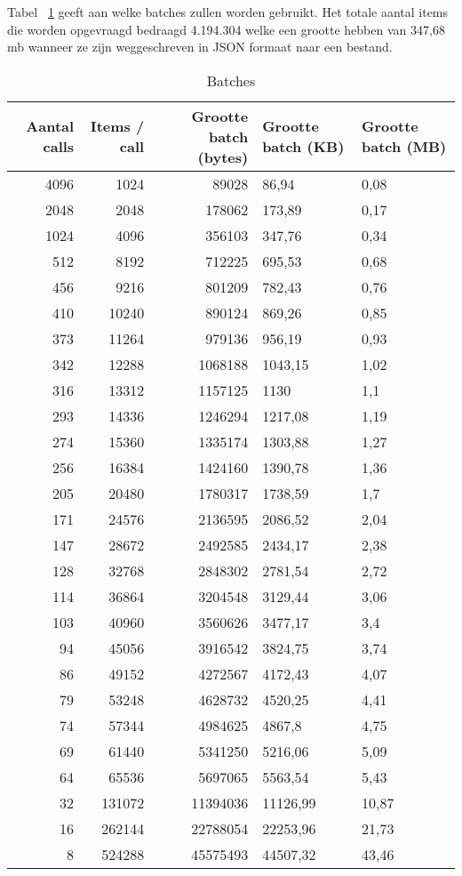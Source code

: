 Tabel ~\ref{tab:Batches} geeft aan welke batches zullen worden gebruikt. Het totale aantal items die worden opgevraagd bedraagd 4.194.304 welke een grootte hebben
van 347,68 mb wanneer ze zijn weggeschreven in JSON formaat naar een bestand.\\

\begin{table}
    \centering
    \begin{tabular}{rrrll}
        \toprule
        \textbf{Aantal calls} & \textbf{Items / call} & \textbf{Grootte batch (bytes)} & \textbf{Grootte batch (KB)} & \textbf{Grootte batch (MB)} \\
        \midrule
        4096 & 1024 & 89028 & 86,94 & 0,08 \\
        2048 & 2048 & 178062 & 173,89 & 0,17 \\
        1024 & 4096 & 356103 & 347,76 & 0,34 \\
        512 & 8192 & 712225 & 695,53 & 0,68 \\
        456 & 9216 & 801209 & 782,43 & 0,76 \\
        410 & 10240 & 890124 & 869,26 & 0,85 \\
        373 & 11264 & 979136 & 956,19 & 0,93 \\
        342 & 12288 & 1068188 & 1043,15 & 1,02 \\
        316 & 13312 & 1157125 & 1130 & 1,1 \\
        293 & 14336 & 1246294 & 1217,08 & 1,19 \\
        274 & 15360 & 1335174 & 1303,88 & 1,27 \\
        256 & 16384 & 1424160 & 1390,78 & 1,36 \\
        205 & 20480 & 1780317 & 1738,59 & 1,7 \\
        171 & 24576 & 2136595 & 2086,52 & 2,04 \\
        147 & 28672 & 2492585 & 2434,17 & 2,38 \\
        128 & 32768 & 2848302 & 2781,54 & 2,72 \\
        114 & 36864 & 3204548 & 3129,44 & 3,06 \\
        103 & 40960 & 3560626 & 3477,17 & 3,4 \\
        94 & 45056 & 3916542 & 3824,75 & 3,74 \\
        86 & 49152 & 4272567 & 4172,43 & 4,07 \\
        79 & 53248 & 4628732 & 4520,25 & 4,41 \\
        74 & 57344 & 4984625 & 4867,8 & 4,75 \\
        69 & 61440 & 5341250 & 5216,06 & 5,09 \\
        64 & 65536 & 5697065 & 5563,54 & 5,43 \\
        32 & 131072 & 11394036 & 11126,99 & 10,87 \\
        16 & 262144 & 22788054 & 22253,96 & 21,73 \\
        8 & 524288 & 45575493 & 44507,32 & 43,46 \\
        \bottomrule
    \end{tabular}
    \caption{Batches}
    \label{tab:Batches}
\end{table}

